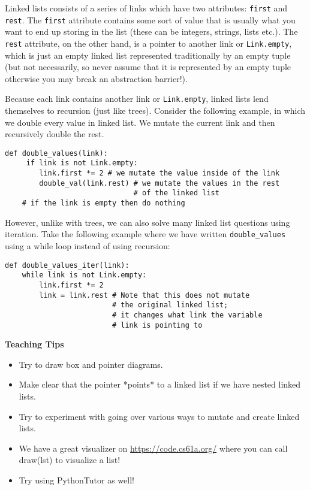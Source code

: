 \begin{blocksection}
Linked lists consists of a series of links which have two attributes: \lstinline{first} and \lstinline{rest}. The \lstinline{first} attribute contains some sort of value that is usually what you want to end up storing in the list (these can be integers, strings, lists etc.). The \lstinline{rest} attribute, on the other hand, is a pointer to another link or \lstinline{Link.empty}, which is just an empty linked list represented traditionally by an empty tuple (but not necessarily, so never assume that it is represented by an empty tuple otherwise you may break an abstraction barrier!).

Because each link contains another link or \lstinline{Link.empty}, linked lists lend themselves to recursion (just like trees). Consider the following example, in which we double every value in linked list. We mutate the current link and then recursively double the rest. 
\vspace{1.5mm}
\begin{lstlisting}
def double_values(link): 
     if link is not Link.empty:
        link.first *= 2 # we mutate the value inside of the link
        double_val(link.rest) # we mutate the values in the rest 
                              # of the linked list
    # if the link is empty then do nothing
\end{lstlisting}

However, unlike with trees, we can also solve many linked list questions using iteration. Take the following example where we have written \lstinline{double_values} using a while loop instead of using recursion:
\vspace{1.5mm}
\begin{lstlisting}
def double_values_iter(link):
    while link is not Link.empty:
        link.first *= 2
        link = link.rest # Note that this does not mutate 
                         # the original linked list; 
                         # it changes what link the variable 
                         # link is pointing to
\end{lstlisting}
\end{blocksection}

\begin{guide}
    \textbf{Teaching Tips}
    \begin{itemize}
       \item Try to draw box and pointer diagrams.
       \item Make clear that the pointer *points* to a linked list if we have nested linked lists.
       \item Try to experiment with going over various ways to mutate and create linked lists. 
       \item We have a great visualizer on \url{https://code.cs61a.org/} where you can call draw(lst) to visualize a list! 
       \item Try using PythonTutor as well!
    \end{itemize}
 \end{guide}